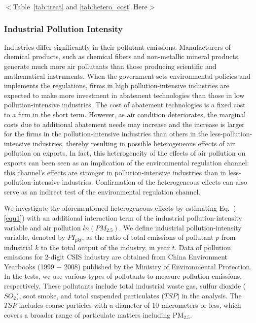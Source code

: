 \documentclass[12pt]{article}
\begin{document}
\begin{center}
$<$Table~\ref{tab:treat} and \ref{tab:hetero_cost} Here$>$
\end{center}

  \subsubsection{Industrial Pollution Intensity}
  \label{sec:5.2.1} 
  Industries differ significantly in their pollutant
  emissions. Manufacturers of chemical products, such as chemical fibers and
  non-metallic mineral products, generate much more air pollutants than those
  producing scientific and mathematical instruments. When the government sets
  environmental policies and implements the regulations, firms in high
  pollution-intensive industries are expected to make more investment in
  abatement technologies than those in low pollution-intensive industries. The
  cost of abatement technologies is a fixed cost to a firm in the short term.
  However, as air condition deteriorates, the marginal costs due to additional
  abatement needs may increase and the increase is larger for the firms in the
  pollution-intensive industries than others in the less-pollution-intensive
  industries, thereby resulting in possible heterogeneous effects of air
  pollution on exports. In fact, this heterogeneity of the effects of air
pollution on exports can been seen as an implication of the environmental
regulation channel: this channel's effects are stronger in
pollution-intensive industries than in less-pollution-intensive industries.
Confirmation of the heterogeneous effects can also serve as an indirect test
of the environmental regulation channel.
  
  We investigate the aforementioned heterogeneous effects by estimating Eq.~(%
\ref{equ1}) with an additional interaction term of the industrial
pollution-intensity variable and air pollution $ln(PM_{2.5})$. We define industrial pollution-intensity
  variable, denoted by $PI_{pkt}$, as the ratio of total emissions of
  pollutant $p$ from industrial $k$ to the total output of the industry, in year $t$. Data of pollution emissions for 2-digit CSIS industry are obtained 
  from China Environment Yearbooks (1999 $-$ 2008) published by the Ministry of Environmental Protection. In the tests, we use various types of pollutants to measure pollution emissions, respectively. These pollutants include total industrial waste gas, sulfur dioxide ($SO_{2}$), soot smoke, and total suspended particulates ($TSP$) in the analysis. The
  $TSP$ includes coarse particles with a diameter of 10 micrometers
  or less, which covers a broader range of particulate matters including $\mathrm{PM_{2.5}}$.
  
\end{document}
